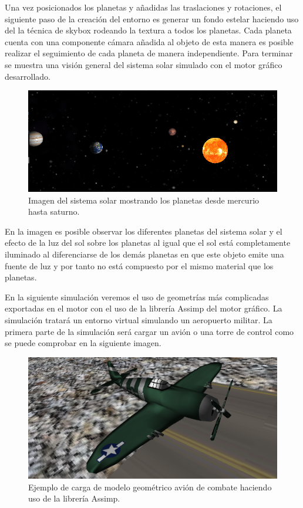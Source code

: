 \documentclass[a4paper, 17pt]{book}
\begin{document}
Una vez posicionados los planetas y añadidas las traslaciones y rotaciones, el siguiente paso de la creación del entorno es generar
un fondo estelar haciendo uso del la técnica de skybox rodeando la textura a todos los planetas. Cada planeta cuenta con una
componente cámara añadida al objeto de esta manera es posible realizar el seguimiento de cada planeta de manera independiente.
Para terminar se muestra una visión general del sistema solar simulado con el motor gráfico desarrollado.

\begin{figure}[H]
    \centering
    \includegraphics[scale=0.50, keepaspectratio]{img/SistemaSolar.png}
    \caption{Imagen del sistema solar mostrando los planetas desde mercurio hasta saturno.}
    \label{figura:Earth}
\end{figure}

En la imagen es posible observar los diferentes planetas del sistema solar y el efecto de la luz del sol sobre los planetas al igual que
el sol está completamente iluminado al diferenciarse de los demás planetas en que este objeto emite una fuente de luz y por tanto no está
compuesto por el mismo material que los planetas.

\vspace{1mm} %

En la siguiente simulación veremos el uso de geometrías más complicadas exportadas en el motor con el uso de la librería Assimp del
motor gráfico. La simulación tratará un entorno virtual simulando un aeropuerto militar. La primera parte de la simulación será cargar
un avión o una torre de control como se puede comprobar en la siguiente imagen.

\begin{figure}[H]
    \centering
    \includegraphics[scale=0.25, keepaspectratio]{img/Airplane.png}
    \caption{Ejemplo de carga de modelo geométrico avión de combate haciendo uso de la librería Assimp.}
    \label{figura:Avion}
\end{figure}
\end{document}
